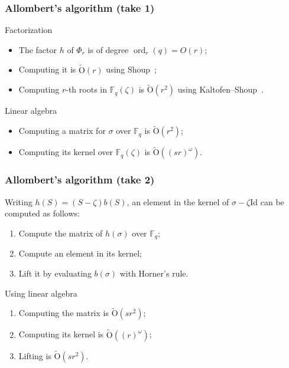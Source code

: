 \documentclass[francais]{beamer}
\def\F {\ensuremath{\mathbb{F}}}
\def\tildO {\ensuremath{\mathrm{\tilde{O}}}}
\def\Id {\ensuremath{\mathrm{Id}}}
\DeclareMathOperator{\ord}{ord}
\begin{document}
\begin{frame}\frametitle{Allombert's algorithm (take 1)}
  \begin{block}{Factorization}
  \begin{itemize}
  \item The factor $h$ of $\Phi_r$ is of degree $\ord_r(q) = O(r)$;
  \item Computing it is $\tildO(r)$ using Shoup~\cite{shoup94};
  \item Computing $r$-th roots in $\F_q(\zeta)$ is $\tildO(r^2)$ using Kaltofen--Shoup~\cite{kaltofen+shoup97}.
  \end{itemize}
\end{block}
  \begin{block}{Linear algebra}
  \begin{itemize}
  \item Computing a matrix for $\sigma$ over $\F_q$ is $\tildO(r^2)$;
  \item Computing its kernel over $\F_q(\zeta)$ is \alert{$\tildO((sr)^\omega)$}.
  \end{itemize}
\end{block}
\end{frame}

\begin{frame}\frametitle{Allombert's algorithm (take 2)}
  \begin{theorem}
    Writing $h(S) = (S - \zeta) b(S)$, an element in the kernel of $\sigma - \zeta \Id$ can be computed as follows:
    \begin{enumerate}
    \item Compute the matrix of $h(\sigma)$ over $\F_q$;
    \item Compute an element in its kernel;
    \item Lift it by evaluating $b(\sigma)$ with Horner's rule.
    \end{enumerate}
  \end{theorem}
  \begin{block}{Using linear algebra}
    \begin{enumerate}
  \item Computing the matrix is $\tildO(s r^2)$;
  \item Computing its kernel is $\tildO((r)^\omega)$;
  \item Lifting is $\tildO(s r^2)$.
  \end{enumerate}
\end{block}
\end{frame}
\end{document}
